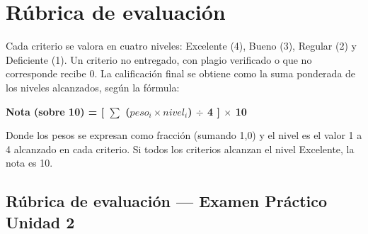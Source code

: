 \documentclass[11pt,a4paper]{article}
\begin{document}
\section{Rúbrica de evaluación}

Cada criterio se valora en cuatro niveles: Excelente (4), Bueno (3), Regular (2) y Deficiente (1). Un criterio no entregado, con plagio verificado o que no corresponde recibe 0. La calificación final se obtiene como la suma ponderada de los niveles alcanzados, según la fórmula:

\begin{center}
    \textbf{Nota (sobre 10) = [ $\sum$ ($peso_i \times nivel_i$) $\div$ 4 ] $\times$ 10}
\end{center}

Donde los pesos se expresan como fracción (sumando 1{,}0) y el nivel es el valor 1 a 4 alcanzado en cada criterio. Si todos los criterios alcanzan el nivel Excelente, la nota es 10.

\subsection*{Rúbrica de evaluación --- Examen Práctico Unidad 2}
\end{document}
